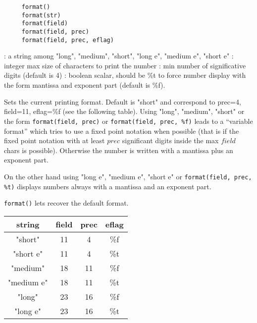 

\begin{mandesc}
\end{mandesc}


\begin{calling_sequence}
   \begin{verbatim}
     format()
     format(str)
     format(field)
     format(field, prec)
     format(field, prec, eflag)
   \end{verbatim}
\end{calling_sequence}


\begin{parameters}

  \begin{varlist}
    : a string among "long", "medium", "short", "long e", "medium e", "short e"
    : integer max size of characters to print the number
    : min number of significative digits (default is 4)
    : boolean scalar, should be \%t to force number
   display with the form mantissa and exponent part (default is \%f).
  \end{varlist}

  \end{parameters}

  \begin{mandescription}
    Sets the current printing format. Default is "short" and
    correspond to prec=4, field=11, eflag=\%f (see the following
    table). Using  "long", "medium", "short" or the form \verb+format(field, prec)+
    or \verb+format(field, prec, %f)+ leads to a ``variable format'' 
    which tries to use a fixed point notation when possible (that
    is if the fixed point notation with at least $prec$ significant digits
    inside the max $field$ chars is possible). Otherwise the number is
    written with a mantissa plus an exponent part.

    On the other hand using  "long e", "medium e", "short e" or
     \verb+format(field, prec, %t)+  displays numbers always
    with a mantissa and an exponent part.

    \verb+format()+ lets recover the default format.

  \begin{tabular}{|c|c|c|c|}
     string  & field & prec & eflag \\
  \hline
   "short"   & 11    & 4    &  \%f \\
   "short e" & 11    & 4    &  \%t \\
   "medium"  & 18    & 11   &  \%f \\
   "medium e"& 18    & 11   &  \%t \\
   "long"    & 23    & 16   &  \%f \\
   "long e"  & 23    & 16   &  \%t \\
   \end{tabular}

  \end{mandescription}

